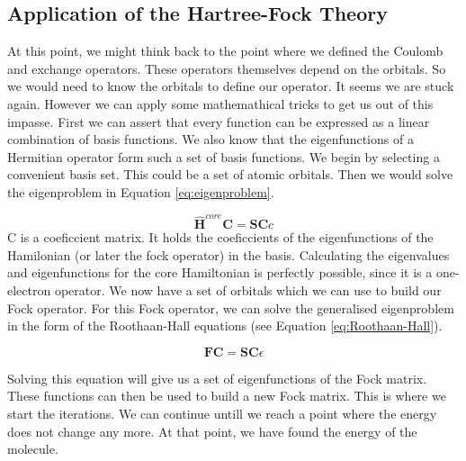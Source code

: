 \subsection{Application of the Hartree-Fock Theory}
\label{subsec:applic}
At this point, we might think back to the point where we defined the Coulomb and
exchange operators. These operators themselves depend on the orbitals. So we would
need to know the orbitals to define our operator. It seems we are stuck again.
However we can apply some mathemathical tricks to get us out of this impasse. 
First we can assert that every function can be expressed as a linear combination
of basis functions. We also know that the eigenfunctions of a Hermitian operator
form such a set of basis functions. We begin by selecting a convenient basis set.
This could be a set of atomic orbitals. Then we would solve the eigenproblem in
Equation \ref{eq:eigenproblem}.

\begin{equation}\label{eq:eigenproblem}
    \boldsymbol{\hat{H}}^{core}\boldsymbol{C} = \boldsymbol{SC}c
\end{equation} 
C is a coeficcient matrix. It holds the coeficcients of the eigenfunctions of the
Hamilonian (or later the fock operator) in the basis. Calculating the eigenvalues 
and eigenfunctions for the core Hamiltonian is perfectly possible, since it is a 
one-electron operator. We now have a set of orbitals which we can use to build 
our Fock operator. For this Fock operator, we can solve the generalised 
eigenproblem in the form of the Roothaan-Hall equations 
(see Equation \ref{eq:Roothaan-Hall}).

\begin{equation}\label{eq:Roothaan-Hall}
    \boldsymbol{FC} = \boldsymbol{SC}\epsilon
\end{equation}

Solving this equation will give us a set of eigenfunctions of the Fock matrix. 
These functions can then be used to build a new Fock matrix. This is where we 
start the iterations. We can continue untill we reach a point where the energy 
does not change any more. At that point, we have found the energy of the molecule.

